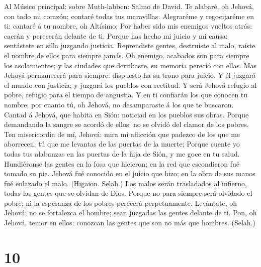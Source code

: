  Al Músico principal: sobre Muth-labben: Salmo de David.
Te alabaré, oh Jehová, con todo mi corazón; contaré todas tus
maravillas.  Alegraréme y regocijaréme en ti: cantaré á tu
nombre, oh Altísimo;  Por haber sido mis enemigos vueltos
atrás: caerán y perecerán delante de ti.  Porque has hecho
mi juicio y mi causa: sentástete en silla juzgando justicia.
 Reprendiste gentes, destruiste al malo, raíste el nombre
de ellos para siempre jamás.  Oh enemigo, acabados son
para siempre los asolamientos; y las ciudades que derribaste, su memoria
pereció con ellas.  Mas Jehová permanecerá para siempre:
dispuesto ha su trono para juicio.  Y él juzgará el mundo
con justicia; y juzgará los pueblos con rectitud.  Y será
Jehová refugio al pobre, refugio para el tiempo de angustia.
 Y en ti confiarán los que conocen tu nombre; por cuanto
tú, oh Jehová, no desamparaste á los que te buscaron. 
Cantad á Jehová, que habita en Sión: noticiad en los pueblos sus obras.
 Porque demandando la sangre se acordó de ellos: no se
olvidó del clamor de los pobres.  Ten misericordia de mí,
Jehová: mira mi aflicción que padezco de los que me aborrecen, tú que me
levantas de las puertas de la muerte;  Porque cuente yo
todas tus alabanzas en las puertas de la hija de Sión, y me goce en tu
salud.  Hundiéronse las gentes en la fosa que hicieron;
en la red que escondieron fué tomado su pie.  Jehová fué
conocido en el juicio que hizo; en la obra de sus manos fué enlazado el
malo. (Higaion. Selah.)  Los malos serán trasladados al
infierno, todas las gentes que se olvidan de Dios. 
Porque no para siempre será olvidado el pobre; ni la esperanza de los
pobres perecerá perpetuamente.  Levántate, oh Jehová; no
se fortalezca el hombre; sean juzgadas las gentes delante de ti.
 Pon, oh Jehová, temor en ellos: conozcan las gentes que
son no más que hombres. (Selah.)

\hypertarget{section-9}{%
\section{10}\label{section-9}}

